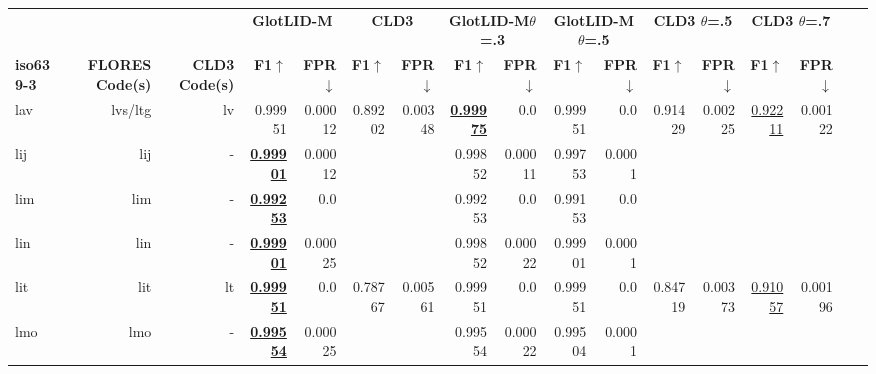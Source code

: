 \documentclass[11pt]{article}
\def\modelname{\mbox{GlotLID-M}\xspace}
\def\flores{FLORES\xspace}
\begin{document}
\begin{table*}[h]
{\begin{tabular}{lrrrrrrrrrrrrrrrr}
\\
\cmidrule(lr){8-15}
& \multicolumn{2}{c}{} 
& \multicolumn{2}{c}{\textbf{\modelname}} 
& \multicolumn{2}{c}{\textbf{CLD3}}
& \multicolumn{2}{c}{\textbf{\modelname $\theta$=.3}} 
& \multicolumn{2}{c}{\textbf{\modelname $\theta$=.5}}
& \multicolumn{2}{c}{\textbf{CLD3  $\theta$=.5}} 
& \multicolumn{2}{c}{\textbf{CLD3 $\theta$=.7}}
\\
\cmidrule(lr){4-5} 
\cmidrule(lr){6-7}
\cmidrule(lr){8-9}
\cmidrule(lr){10-11}
\cmidrule(lr){12-13}
\cmidrule(lr){14-15}
\textbf{iso639-3
} & \textbf{\flores Code(s)} & \textbf{CLD3 Code(s)} & 
\textbf{F1}$\uparrow$ &
\textbf{FPR}$\downarrow$ &
\textbf{F1}$\uparrow$  &
\textbf{FPR}$\downarrow$ &
\textbf{F1}$\uparrow$ &
\textbf{FPR}$\downarrow$ &
\textbf{F1}$\uparrow$ &
\textbf{FPR}$\downarrow$ & 
\textbf{F1}$\uparrow$ &
\textbf{FPR}$\downarrow$ &
\textbf{F1}$\uparrow$ &
\textbf{FPR}$\downarrow$
\\
\midrule
lav         & lvs/ltg         & lv         & 0.99951         & 0.00012         & 0.89202         & 0.00348         & \textbf{\underline{0.99975}}         & 0.0         & 0.99951         & 0.0         & 0.91429         & 0.00225         & \underline{0.92211}         & 0.00122         \\
lij         & lij         & -         & \textbf{\underline{0.99901}}         & 0.00012         &          &          & 0.99852         & 0.00011         & 0.99753         & 0.0001         &          &          &          &          \\
lim         & lim         & -         & \textbf{\underline{0.99253}}         & 0.0         &          &          & 0.99253         & 0.0         & 0.99153         & 0.0         &          &          &          &          \\
lin         & lin         & -         & \textbf{\underline{0.99901}}         & 0.00025         &          &          & 0.99852         & 0.00022         & 0.99901         & 0.0001         &          &          &          &          \\
lit         & lit         & lt         & \textbf{\underline{0.99951}}         & 0.0         & 0.78767         & 0.00561         & 0.99951         & 0.0         & 0.99951         & 0.0         & 0.84719         & 0.00373         & \underline{0.91057}         & 0.00196         \\
lmo         & lmo         & -         & \textbf{\underline{0.99554}}         & 0.00025         &          &          & 0.99554         & 0.00022         & 0.99504         & 0.0001         &          &          &          &          \\

\end{tabular}}
\end{table*}
\end{document}
